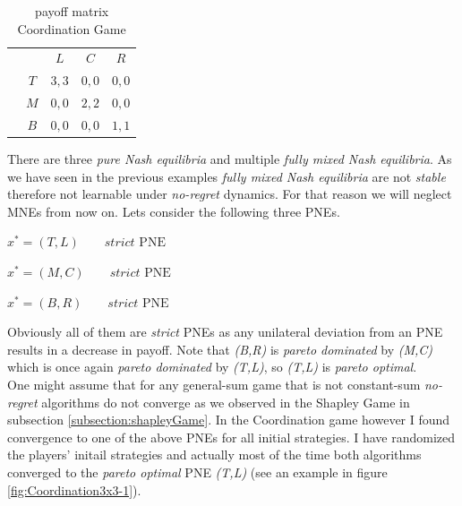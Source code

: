 \begin{table}[H]\centering
\setlength{\extrarowheight}{2pt}
\begin{tabular}{cc|c|c|c|}
  & \multicolumn{1}{c}{} & \multicolumn{1}{c}{$L$}  & \multicolumn{1}{c}{$C$}  & \multicolumn{1}{c}{$R$} \\\cline{3-5}
            & $T$ & $3,3$ & $0,0$ & $0,0$ \\ \cline{3-5}
            & $M$ & $0,0$ & $2,2$ & $0,0$ \\\cline{3-5}
            & $B$ & $0,0$ & $0,0$ & $1,1$ \\\cline{3-5}
\end{tabular}\caption{\label{tab:payoffCoordination3x3}payoff matrix Coordination Game}
\end{table}

There are three \textit{pure Nash equilibria} and multiple \textit{fully mixed Nash equilibria}. As we have seen in the previous examples \textit{fully mixed Nash equilibria} are not \textit{stable} therefore not learnable under \textit{no-regret} dynamics. For that reason we will neglect MNEs from now on. Lets consider the following three PNEs.

\begin{description}\centering
    \item $x^{*} = (T,L) \qquad \textit{strict }\text{PNE}$
    \item $x^{*} = (M,C) \qquad \textit{strict }\text{PNE}$
    \item $x^{*} = (B,R) \qquad \textit{strict }\text{PNE}$
\end{description}

Obviously all of them are \textit{strict} PNEs as any unilateral deviation from an PNE results in a decrease in payoff. Note that \textit{(B,R)} is \textit{pareto dominated} by \textit{(M,C)} which is once again \textit{pareto dominated} by \textit{(T,L)}, so \textit{(T,L)} is \textit{pareto optimal}. \\

One might assume that for any general-sum game that is not constant-sum \textit{no-regret} algorithms do not converge as we observed in the Shapley Game in subsection \ref{subsection:shapleyGame}. In the Coordination game however I found convergence to one of the above PNEs for all initial strategies. I have randomized the players' initail strategies and actually most of the time both algorithms converged to the \textit{pareto optimal} PNE \textit{(T,L)} (see an example in figure \ref{fig:Coordination3x3-1}). 

